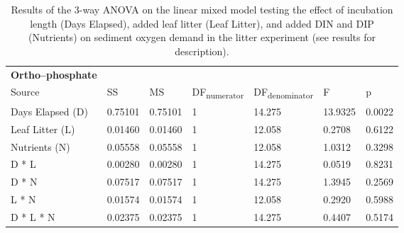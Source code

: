 \begin{table}
\begin{tabular}{ l l l l l l l }
\textbf{Ortho--phosphate} & & & & & &\\
Source           & SS      & MS      & DF\textsubscript{numerator} & DF\textsubscript{denominator} & F       & p  \\
Days Elapsed (D) & 0.75101 & 0.75101 & 1                           & 14.275                        & 13.9325 & 0.0022 \\
Leaf Litter (L)  & 0.01460 & 0.01460 & 1                           & 12.058                        & 0.2708  & 0.6122 \\
Nutrients (N)    & 0.05558 & 0.05558 & 1                           & 12.058                        & 1.0312  & 0.3298 \\
D * L            & 0.00280 & 0.00280 & 1                           & 14.275                        & 0.0519  & 0.8231 \\
D * N            & 0.07517 & 0.07517 & 1                           & 14.275                        & 1.3945  & 0.2569 \\
L * N            & 0.01574 & 0.01574 & 1                           & 12.058                        & 0.2920  & 0.5988 \\
D * L * N        & 0.02375 & 0.02375 & 1                           & 14.275                        & 0.4407  & 0.5174 \\

\end{tabular}
\caption{Results of the 3-way ANOVA on the linear mixed model testing the effect of incubation length (Days Elapsed), added leaf litter (Leaf Litter), and added DIN and DIP (Nutrients) on sediment oxygen demand in the litter experiment (see results for description).}
\end{table}